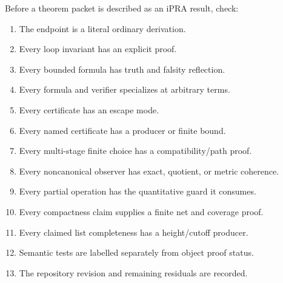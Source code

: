Before a theorem packet is described as an iPRA result, check:

\begin{enumerate}[label=$\square$]
\item The endpoint is a literal ordinary derivation.
\item Every loop invariant has an explicit  proof.
\item Every bounded formula has truth and falsity reflection.
\item Every formula and verifier specializes at arbitrary terms.
\item Every certificate has an escape mode.
\item Every named certificate has a producer or finite bound.
\item Every multi-stage finite choice has a compatibility/path proof.
\item Every noncanonical observer has exact, quotient, or metric coherence.
\item Every partial operation has the quantitative guard it consumes.
\item Every compactness claim supplies a finite net and coverage proof.
\item Every claimed list completeness has a height/cutoff producer.
\item Semantic tests are labelled separately from object proof status.
\item The repository revision and remaining residuals are recorded.
\end{enumerate}
